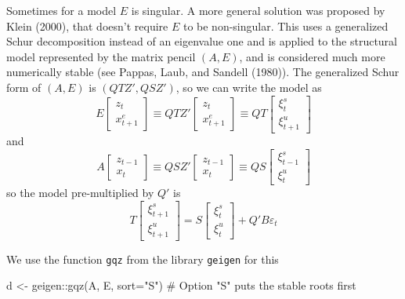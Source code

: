 \documentclass[
  letterpaper,
]{book}
\newenvironment{Shaded}{\begin{snugshade}}{\end{snugshade}}
\newcommand{\AttributeTok}[1]{\textcolor[rgb]{0.40,0.45,0.13}{#1}}
\newcommand{\CommentTok}[1]{\textcolor[rgb]{0.37,0.37,0.37}{#1}}
\newcommand{\FunctionTok}[1]{\textcolor[rgb]{0.28,0.35,0.67}{#1}}
\newcommand{\NormalTok}[1]{\textcolor[rgb]{0.00,0.23,0.31}{#1}}
\newcommand{\OtherTok}[1]{\textcolor[rgb]{0.00,0.23,0.31}{#1}}
\newcommand{\SpecialCharTok}[1]{\textcolor[rgb]{0.37,0.37,0.37}{#1}}
\newcommand{\StringTok}[1]{\textcolor[rgb]{0.13,0.47,0.30}{#1}}
\begin{document}
Sometimes for a model \(E\) is singular. A more general solution was
proposed by Klein (2000), that doesn't require \(E\) to be non-singular.
This uses a generalized Schur decomposition instead of an eigenvalue one
and is applied to the structural model represented by the matrix pencil
\((A,E)\), and is considered much more numerically stable (see Pappas,
Laub, and Sandell (1980)). The generalized Schur form of \((A,E)\) is
\((QTZ', QSZ')\), so we can write the model as \[
E \begin{bmatrix} z_t \\ x_{t+1}^e \end{bmatrix} \equiv QTZ' \begin{bmatrix} z_t \\ x_{t+1}^e \end{bmatrix} \equiv QT \begin{bmatrix} \xi_t^s \\ \xi_{t+1}^u \end{bmatrix} 
\] and \[
A \begin{bmatrix} z_{t-1} \\ x_t \end{bmatrix} \equiv QSZ' \begin{bmatrix} z_{t-1} \\ x_t \end{bmatrix} \equiv QS\begin{bmatrix} \xi_{t-1}^s \\ \xi_t^u \end{bmatrix} 
\] so the model pre-multiplied by \(Q'\) is \[
T \begin{bmatrix} \xi_{t+1}^s \\ \xi_{t+1}^u \end{bmatrix} = S \begin{bmatrix} \xi_t^s \\ \xi_t^u \end{bmatrix} + Q'B\varepsilon_t
\]

We use the function \texttt{gqz} from the library \texttt{geigen} for
this

\begin{Shaded}
\begin{Highlighting}[]
\NormalTok{d }\OtherTok{\textless{}{-}}\NormalTok{ geigen}\SpecialCharTok{::}\FunctionTok{gqz}\NormalTok{(A, E, }\AttributeTok{sort=}\StringTok{"S"}\NormalTok{) }\CommentTok{\# Option "S" puts the stable roots first}
\end{Highlighting}
\end{Shaded}
\end{document}
